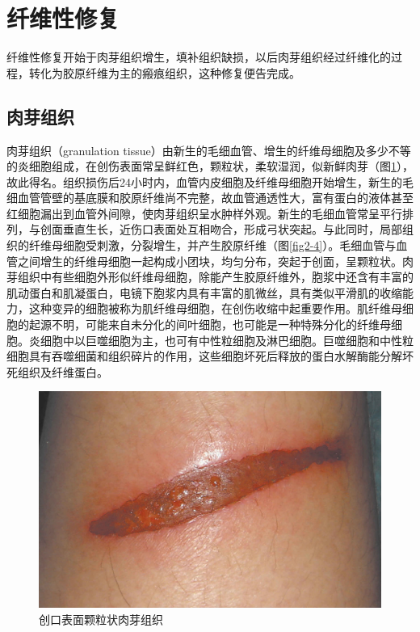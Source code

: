 \section{纤维性修复}

纤维性修复开始于肉芽组织增生，填补组织缺损，以后肉芽组织经过纤维化的过程，转化为胶原纤维为主的瘢痕组织，这种修复便告完成。

\subsection{肉芽组织}

肉芽组织（granulation
tissue）由新生的毛细血管、增生的纤维母细胞及多少不等的炎细胞组成，在创伤表面常呈鲜红色，颗粒状，柔软湿润，似新鲜肉芽（图\ref{fig2-3}），故此得名。组织损伤后24小时内，血管内皮细胞及纤维母细胞开始增生，新生的毛细血管管壁的基底膜和胶原纤维尚不完整，故血管通透性大，富有蛋白的液体甚至红细胞漏出到血管外间隙，使肉芽组织呈水肿样外观。新生的毛细血管常呈平行排列，与创面垂直生长，近伤口表面处互相吻合，形成弓状突起。与此同时，局部组织的纤维母细胞受刺激，分裂增生，并产生胶原纤维（图\ref{fig2-4}）。毛细血管与血管之间增生的纤维母细胞一起构成小团块，均匀分布，突起于创面，呈颗粒状。肉芽组织中有些细胞外形似纤维母细胞，除能产生胶原纤维外，胞浆中还含有丰富的肌动蛋白和肌凝蛋白，电镜下胞浆内具有丰富的肌微丝，具有类似平滑肌的收缩能力，这种变异的细胞被称为肌纤维母细胞，在创伤收缩中起重要作用。肌纤维母细胞的起源不明，可能来自未分化的间叶细胞，也可能是一种特殊分化的纤维母细胞。炎细胞中以巨噬细胞为主，也可有中性粒细胞及淋巴细胞。巨噬细胞和中性粒细胞具有吞噬细菌和组织碎片的作用，这些细胞坏死后释放的蛋白水解酶能分解坏死组织及纤维蛋白。

\begin{figure}[!h]
	\begin{center}
		\includegraphics{./images/Image00026.jpg}
	\end{center}
	\captionsetup{justification=centering}
	\caption{创口表面颗粒状肉芽组织}
	\label{fig2-3}
\end{figure}


